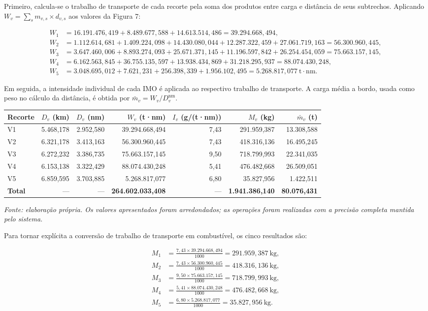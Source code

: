 \documentclass[brazil,]{article}
\begin{document}
Primeiro, calcula-se o trabalho de transporte de cada recorte pela soma
dos produtos entre carga e distância de seus subtrechos. Aplicando
\(W_v=\sum_s m_{v,s}\times d_{v,s}\) aos valores da Figura 7:

\[
\begin{aligned}
W_1&=16.191.476{,}419+8.489.677{,}588+14.613.514{,}486
=39.294.668{,}494,\\
W_2&=1.112.614{,}681+1.409.224{,}098+14.430.080{,}044
+12.287.322{,}459+27.061.719{,}163
=56.300.960{,}445,\\
W_3&=3.647.460{,}006+8.893.274{,}093+25.671.371{,}145
+11.196.597{,}842+26.254.454{,}059
=75.663.157{,}145,\\
W_4&=6.162.563{,}845+36.755.135{,}597+13.938.434{,}869
+31.218.295{,}937
=88.074.430{,}248,\\
W_5&=3.048.695{,}012+7.621{,}231+256.398{,}339+1.956.102{,}495
=5.268.817{,}077\ \mathrm{t\cdot nm}.
\end{aligned}
\]

Em seguida, a intensidade individual de cada IMO é aplicada ao
respectivo trabalho de transporte. A carga média a bordo, usada como
peso no cálculo da distância, é obtida por
\(\bar m_v=W_v/D_v^{\mathrm{nm}}\).

{\scriptsize
\begin{longtable}[]{@{}lrrrrrr@{}}
\toprule
Recorte & \(D_v\) (km) & \(D_v\) (nm) & \(W_v\) (t·nm) &
\(I_v\) (g/(t·nm)) & \(M_v\) (kg) & \(\bar m_v\) (t)\tabularnewline
\midrule
\endhead
V1 & 5.468,178 & 2.952,580 & 39.294.668,494 & 7,43 & 291.959,387 & 13.308,588\tabularnewline
V2 & 6.321,178 & 3.413,163 & 56.300.960,445 & 7,43 & 418.316,136 & 16.495,245\tabularnewline
V3 & 6.272,232 & 3.386,735 & 75.663.157,145 & 9,50 & 718.799,993 & 22.341,035\tabularnewline
V4 & 6.153,138 & 3.322,429 & 88.074.430,248 & 5,41 & 476.482,668 & 26.509,051\tabularnewline
V5 & 6.859,595 & 3.703,885 & 5.268.817,077 & 6,80 & 35.827,956 & 1.422,511\tabularnewline
\textbf{Total} & --- & --- & \textbf{264.602.033,408} & --- &
\textbf{1.941.386,140} & \textbf{80.076,431}\tabularnewline
\bottomrule
\end{longtable}
}

\emph{Fonte: elaboração própria. Os valores apresentados foram
arredondados; as operações foram realizadas com a precisão completa
mantida pelo sistema.}

Para tornar explícita a conversão de trabalho de transporte em
combustível, os cinco resultados são:

\[
\begin{aligned}
M_1&=\frac{7{,}43\times39.294.668{,}494}{1000}=291.959{,}387\ \mathrm{kg},\\
M_2&=\frac{7{,}43\times56.300.960{,}445}{1000}=418.316{,}136\ \mathrm{kg},\\
M_3&=\frac{9{,}50\times75.663.157{,}145}{1000}=718.799{,}993\ \mathrm{kg},\\
M_4&=\frac{5{,}41\times88.074.430{,}248}{1000}=476.482{,}668\ \mathrm{kg},\\
M_5&=\frac{6{,}80\times5.268.817{,}077}{1000}=35.827{,}956\ \mathrm{kg}.
\end{aligned}
\]
\end{document}
